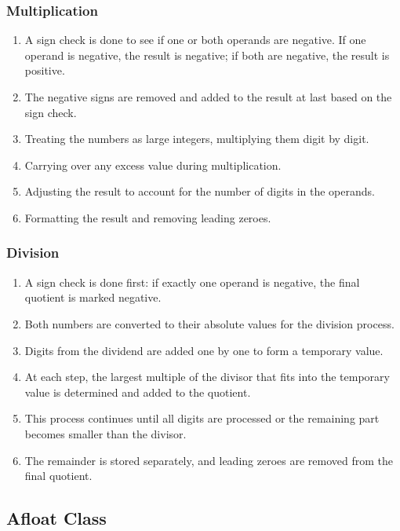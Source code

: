 \documentclass[12pt]{article}
\begin{document}
\subsubsection{Multiplication}
\begin{enumerate}
    \item A sign check is done to see if one or both operands are negative. If one operand is negative, the result is negative; if both are negative, the result is positive.
    \item The negative signs are removed and added to the result at last based on the sign check.
    \item Treating the numbers as large integers, multiplying them digit by digit.
    \item Carrying over any excess value during multiplication.
    \item Adjusting the result to account for the number of digits in the operands.
    \item Formatting the result and removing leading zeroes.
\end{enumerate}

\subsubsection{Division}
\begin{enumerate}
    \item A sign check is done first: if exactly one operand is negative, the final quotient is marked negative.
    \item Both numbers are converted to their absolute values for the division process.
    \item Digits from the dividend are added one by one to form a temporary value.
    \item At each step, the largest multiple of the divisor that fits into the temporary value is determined and added to the quotient.
    \item This process continues until all digits are processed or the remaining part becomes smaller than the divisor.
    \item The remainder is stored separately, and leading zeroes are removed from the final quotient.
\end{enumerate}

\subsection{Afloat Class}
\end{document}
